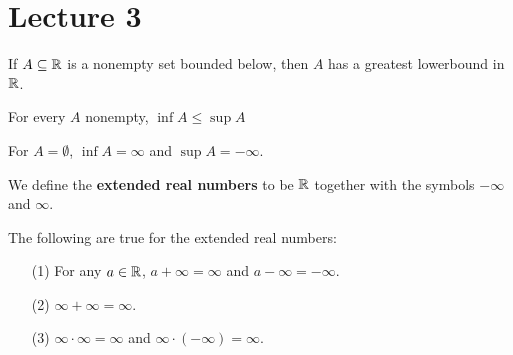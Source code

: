 \section*{Lecture 3}

\begin{theorem}\label{thm_3.11}
    If $A \subseteq \mathbb{R}$ is a nonempty set bounded below, then $A$ has a greatest
    lowerbound in $\mathbb{R}$.
\end{theorem}

\begin{lemma}\label{lemma_3.12}
    For every $A$ nonempty,  $\inf{A} \leq \sup{A}$
\end{lemma}

\begin{example}\label{}
    For $A=\emptyset$, $\inf{A}=\infty$ and $\sup{A}=-\infty$.
\end{example}

\begin{definition}
    We define the \textbf{extended real numbers} to be $\mathbb{R}$ together with the
    symbols  $-\infty$ and  $\infty$.
\end{definition}

\begin{theorem}\label{thm_3.13}
    The following are true for the extended real numbers:
    \begin{enumerate}
        \item[(1)] For any $a \in \mathbb{R}$,  $a+\infty=\infty$ and
            $a-\infty=-\infty$.

        \item[(2)] $\infty+\infty=\infty$.

        \item[(3)] $\infty \cdot \infty=\infty$ and  $\infty \cdot
            (-\infty)=\infty$.
    \end{enumerate}
\end{theorem}

